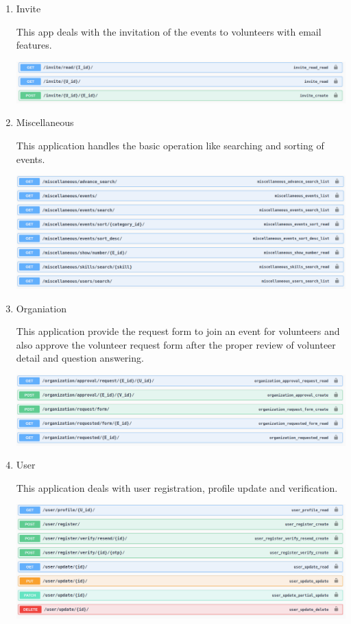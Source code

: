 \documentclass[12pt]{article}
\begin{document}
\begin{enumerate}
\clearpage
\clearpage

	\item Invite
	
	This app deals with the invitation of the events to volunteers with email features.	
	
	\includegraphics[scale = 0.35]{invite.png}	
	
	\item Miscellaneous
	
	This application handles the basic operation like searching and sorting of events.
	
	\includegraphics[scale = 0.35]{miscellaneous.png}	
	
	\item Organiation
	
	This application provide the request form to join an event for volunteers and also approve the volunteer request form after the proper review of volunteer detail and question answering.
	
	\includegraphics[scale = 0.35]{organization.png}	

\clearpage
\clearpage

	\item User

	This application deals with user registration, profile update and verification.
	
	\includegraphics[scale = 0.35]{user.png}	
	

\end{enumerate}
\end{document}
